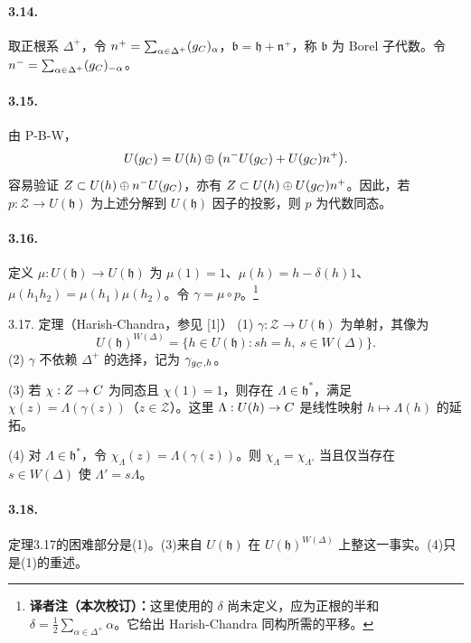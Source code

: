 \paragraph*{3.14.} 取正根系 $\Delta^+$，令 $n^+=\sum_{\alpha\in\Delta^+}(g_{C})_\alpha$，$\mathfrak b=\mathfrak h+\mathfrak n^+$，称 $\mathfrak b$ 为 Borel 子代数。令 $n^-=\sum_{\alpha\in\Delta^+}(g_{C})_{-\alpha}$。
\paragraph*{3.15.} 由 P-B-W，
\[
 U(g_{C})=U(h)\oplus\bigl(n^-U(g_{C})+U(g_{C})n^+\bigr).
\]
容易验证 $Z\subset U(h)\oplus n^-U(g_{C})$，亦有 $Z\subset U(h)\oplus U(g_{C})n^+$。因此，若 $p:\mathcal Z\to U(\mathfrak h)$ 为上述分解到 $U(\mathfrak h)$ 因子的投影，则 $p$ 为代数同态。
\paragraph*{3.16.} 定义 $\mu:U(\mathfrak h)\to U(\mathfrak h)$ 为 $\mu(1)=1$、$\mu(h)=h-\delta(h)1$、$\mu(h_1h_2)=\mu(h_1)\mu(h_2)$。令 $\gamma=\mu\circ p$。\footnote{\textbf{译者注（本次校订）：}这里使用的 $\delta$ 尚未定义，应为正根的半和 $\delta=\frac12\sum_{\alpha\in\Delta^+}\alpha$。它给出 Harish-Chandra 同构所需的平移。}
\begin{originaltheorem}{3.17. 定理（Harish-Chandra，参见 [1]）}
(1) $\gamma:\mathcal Z\to U(\mathfrak h)$ 为单射，其像为
\[
 U(\mathfrak h)^{W(\Delta)}=\{h\in U(\mathfrak h):sh=h,\ s\in W(\Delta)\}.
\]
(2) $\gamma$ 不依赖 $\Delta^+$ 的选择，记为 $\gamma_{g_{C},h}$。

(3) 若 $\chi:Z\to C$ 为同态且 $\chi(1)=1$，则存在 $\Lambda\in\mathfrak h^*$，满足 $\chi(z)=\Lambda(\gamma(z))$（$z\in\mathcal Z$）。这里 $\Lambda:U(h)\to C$ 是线性映射 $h\mapsto\Lambda(h)$ 的延拓。

(4) 对 $\Lambda\in\mathfrak h^*$，令 $\chi_\Lambda(z)=\Lambda(\gamma(z))$。则 $\chi_\Lambda=\chi_{\Lambda'}$ 当且仅当存在 $s\in W(\Delta)$ 使 $\Lambda'=s\Lambda$。
\end{originaltheorem}
\paragraph*{3.18.} 定理3.17的困难部分是(1)。(3)来自 $U(\mathfrak h)$ 在 $U(\mathfrak h)^{W(\Delta)}$ 上整这一事实。(4)只是(1)的重述。
